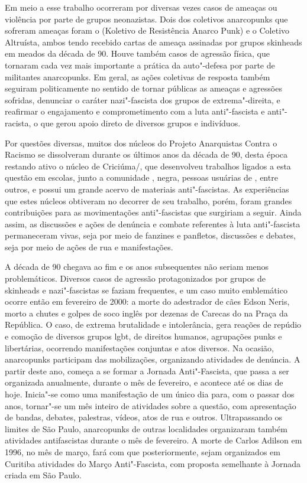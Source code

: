 Em meio a esse trabalho ocorreram por diversas vezes casos de ameaças ou violência por parte de grupos neonazistas. Dois dos coletivos anarcopunks que sofreram ameaças foram o  (Koletivo de Resistência Anarco Punk) e o Coletivo Altruísta, ambos tendo recebido cartas de ameaça assinadas por grupos skinheads em meados da década de 90. Houve também casos de agressão física, que tornaram cada vez mais importante a prática da auto"-defesa por parte de militantes anarcopunks. Em geral, as ações coletivas de resposta também seguiram politicamente no sentido de tornar públicas as ameaças e agressões sofridas, denunciar o caráter nazi"-fascista dos grupos de extrema"-direita, e reafirmar o engajamento e comprometimento com a luta anti"-fascista e anti"-racista, o que gerou apoio direto de diversos grupos e indivíduos.

Por questões diversas, muitos dos núcleos do Projeto Anarquistas Contra o Racismo se dissolveram durante os últimos anos da década de 90, desta época restando ativo o núcleo de Criciúma/, que desenvolveu trabalhos ligados a esta questão em escolas, junto a comunidade , negra, pessoas usuárias de , entre outros, e possui um grande acervo de materiais anti"-fascistas. As experiências que estes núcleos obtiveram no decorrer de seu trabalho, porém, foram grandes contribuições para as movimentações anti"-fascistas que surgiriam a seguir. Ainda assim, as discussões e ações de denúncia e combate referentes à luta anti"-fascista permaneceram vivas, seja por meio de fanzines e panfletos, discussões e debates, seja por meio de ações de rua e manifestações.

A década de 90 chegava ao fim e os anos subsequentes não seriam menos problemáticos. Diversos casos de agressão protagonizados por grupos de skinheads e nazi"-fascistas se faziam frequentes, e um caso muito emblemático ocorre então em fevereiro de 2000: a morte do adestrador de cães Edson Neris, morto a chutes e golpes de soco inglês por dezenas de Carecas do  na Praça da República. O caso, de extrema brutalidade e intolerância, gera reações de repúdio e comoção de diversos grupos lgbt, de direitos humanos, agrupações punks e libertárias, ocorrendo manifestações conjuntas e atos diversos. Na ocasião, anarcopunks participam das mobilizações, organizando atividades de denúncia. A partir deste ano, começa a se formar a Jornada Anti"-Fascista, que passa a ser organizada anualmente, durante o mês de fevereiro, e acontece até os dias de hoje. Inicia"-se como uma manifestação de um único dia para, com o passar dos anos, tornar"-se um mês inteiro de atividades sobre a questão, com apresentação de bandas, debates, palestras, vídeos, atos de rua e outros. Ultrapassando os limites de São Paulo, anarcopunks de outras localidades organizaram também atividades antifascistas durante o mês de fevereiro. A morte de Carlos Adilson em 1996, no mês de março, fará com que posteriormente, sejam organizados em Curitiba atividades do Março Anti"-Fascista, com proposta semelhante à Jornada criada em São Paulo.

